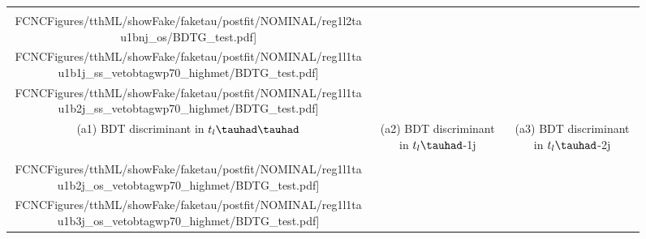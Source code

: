 \begin{figure}[H]
\centering
\begin{tabular}{@{}ccc@{}}
  \texttt{[image: \\FCNCFigures/tthML/showFake/faketau/postfit/NOMINAL/reg1l2tau1bnj\_os/BDTG\_test.pdf]}&
  \texttt{[image: \\FCNCFigures/tthML/showFake/faketau/postfit/NOMINAL/reg1l1tau1b1j\_ss\_vetobtagwp70\_highmet/BDTG\_test.pdf]}&
  \texttt{[image: \\FCNCFigures/tthML/showFake/faketau/postfit/NOMINAL/reg1l1tau1b2j\_ss\_vetobtagwp70\_highmet/BDTG\_test.pdf]}\\
(a1) BDT discriminant in $t_l\thadhad$ & (a2) BDT discriminant in  $t_l\tauhad$-1j& (a3) BDT discriminant in $t_l\tauhad$-2j\\
  \texttt{[image: \\FCNCFigures/tthML/showFake/faketau/postfit/NOMINAL/reg1l1tau1b2j\_os\_vetobtagwp70\_highmet/BDTG\_test.pdf]}&
  \texttt{[image: \\FCNCFigures/tthML/showFake/faketau/postfit/NOMINAL/reg1l1tau1b3j\_os\_vetobtagwp70\_highmet/BDTG\_test.pdf]}&

\end{tabular}
\end{figure}
